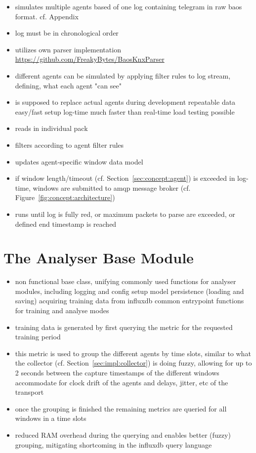 \begin{itemize}
	\item simulates multiple agents based of one log containing telegram in raw \gls{baos} format. cf. Appendix~
	\item log must be in chronological order
	\item utilizes own parser implementation \url{https://github.com/FreakyBytes/BaosKnxParser}
	\item different agents can be simulated by applying filter rules to log stream, defining, what each agent "can see"
	\item is supposed to replace actual agents during development
	\subitem repeatable data
	\subitem easy/fast setup
	\subitem log-time much faster than real-time
	\subitem load testing possible
	\item reads in individual pack
	\item filters according to agent filter rules
	\item updates agent-specific window data model
	\item if window length/timeout (cf. Section~\ref{sec:concept:agent}) is exceeded in log-time, windows are submitted to \gls{amqp} message broker (cf. Figure~\ref{fig:concept:architecture})
	\item runs until log is fully red, or maximum packets to parse are exceeded, or defined end timestamp is reached
\end{itemize}

\section{The Analyser Base Module}
\label{sec:impl:base}

\begin{itemize}
	\item non functional base class, unifying commonly used functions for analyser modules, including
		\subitem logging and config setup
		\subitem model persistence (loading and saving)
		\subitem acquiring training data from \gls{influxdb}
		\subitem common entrypoint functions for training and analyse modes
	\item training data is generated by first querying the  metric for the requested training period
	\item this metric is used to group the different agents by time slots, similar to what the collector (cf. Section~\ref{sec:impl:collector}) is doing
		\subitem fuzzy, allowing for up to 2 seconds between the capture timestamps of the different windows
		\subitem accommodate for clock drift of the agents and delays, jitter, etc of the transport
	\item once the grouping is finished the remaining metrics are queried for all windows in a time slots
	\item reduced RAM overhead during the querying and enables better (fuzzy) grouping, mitigating shortcoming in the \gls{influxdb} query language
\end{itemize}

